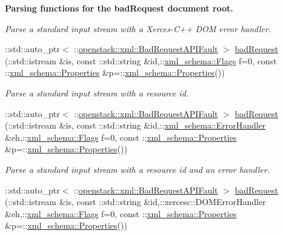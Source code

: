 \begin{Indent}{\bf Parsing functions for the badRequest document root.}
\begin{DoxyCompactItemize}
\begin{DoxyCompactList}\small\item\em Parse a standard input stream with a Xerces-\/C++ DOM error handler. \item\end{DoxyCompactList}\item 
::std::auto\_\-ptr$<$ ::\hyperlink{classopenstack_1_1xml_1_1BadRequestAPIFault}{openstack::xml::BadRequestAPIFault} $>$ \hyperlink{namespaceopenstack_1_1xml_ab0eca56e294f197899df14eff3707261}{badRequest} (::std::istream \&is, const ::std::string \&id,::\hyperlink{namespacexml__schema_affb4c227cbd9aa7453dd1dc5a1401943}{xml\_\-schema::Flags} f=0, const ::\hyperlink{namespacexml__schema_ad27ce19a7ee1d3b1064092648898f64c}{xml\_\-schema::Properties} \&p=::\hyperlink{namespacexml__schema_ad27ce19a7ee1d3b1064092648898f64c}{xml\_\-schema::Properties}())
\begin{DoxyCompactList}\small\item\em Parse a standard input stream with a resource id. \item\end{DoxyCompactList}\item 
::std::auto\_\-ptr$<$ ::\hyperlink{classopenstack_1_1xml_1_1BadRequestAPIFault}{openstack::xml::BadRequestAPIFault} $>$ \hyperlink{namespaceopenstack_1_1xml_a1516978a82457eb6ed20388a90a7986b}{badRequest} (::std::istream \&is, const ::std::string \&id,::\hyperlink{namespacexml__schema_ab1c9361bfd3b404eaabf0c31eded79dc}{xml\_\-schema::ErrorHandler} \&eh,::\hyperlink{namespacexml__schema_affb4c227cbd9aa7453dd1dc5a1401943}{xml\_\-schema::Flags} f=0, const ::\hyperlink{namespacexml__schema_ad27ce19a7ee1d3b1064092648898f64c}{xml\_\-schema::Properties} \&p=::\hyperlink{namespacexml__schema_ad27ce19a7ee1d3b1064092648898f64c}{xml\_\-schema::Properties}())
\begin{DoxyCompactList}\small\item\em Parse a standard input stream with a resource id and an error handler. \item\end{DoxyCompactList}\item 
::std::auto\_\-ptr$<$ ::\hyperlink{classopenstack_1_1xml_1_1BadRequestAPIFault}{openstack::xml::BadRequestAPIFault} $>$ \hyperlink{namespaceopenstack_1_1xml_a81ea159cb268ddc025f4ee125e1affe2}{badRequest} (::std::istream \&is, const ::std::string \&id,::xercesc::DOMErrorHandler \&eh,::\hyperlink{namespacexml__schema_affb4c227cbd9aa7453dd1dc5a1401943}{xml\_\-schema::Flags} f=0, const ::\hyperlink{namespacexml__schema_ad27ce19a7ee1d3b1064092648898f64c}{xml\_\-schema::Properties} \&p=::\hyperlink{namespacexml__schema_ad27ce19a7ee1d3b1064092648898f64c}{xml\_\-schema::Properties}())

\end{DoxyCompactItemize}
\end{Indent}
